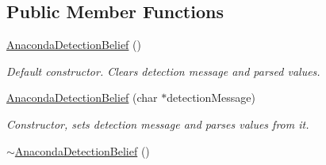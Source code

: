 \subsection*{Public Member Functions}
\begin{DoxyCompactItemize}
\item 
\hypertarget{class_anaconda_detection_belief_a66764554ec7d33b77f635272ee5fea90}{
\hyperlink{class_anaconda_detection_belief_a66764554ec7d33b77f635272ee5fea90}{AnacondaDetectionBelief} ()}
\label{class_anaconda_detection_belief_a66764554ec7d33b77f635272ee5fea90}

\begin{DoxyCompactList}\small\item\em Default constructor. Clears detection message and parsed values. \end{DoxyCompactList}\item 
\hypertarget{class_anaconda_detection_belief_a9b99d8c44fdaf565ab5b0d0f572c4a48}{
\hyperlink{class_anaconda_detection_belief_a9b99d8c44fdaf565ab5b0d0f572c4a48}{AnacondaDetectionBelief} (char $\ast$detectionMessage)}
\label{class_anaconda_detection_belief_a9b99d8c44fdaf565ab5b0d0f572c4a48}

\begin{DoxyCompactList}\small\item\em Constructor, sets detection message and parses values from it. \end{DoxyCompactList}\item 
\hypertarget{class_anaconda_detection_belief_a0806ac92b77f2a8749c3047ae853ca6c}{
\hyperlink{class_anaconda_detection_belief_a0806ac92b77f2a8749c3047ae853ca6c}{$\sim$AnacondaDetectionBelief} ()}
\label{class_anaconda_detection_belief_a0806ac92b77f2a8749c3047ae853ca6c}


\end{DoxyCompactItemize}

